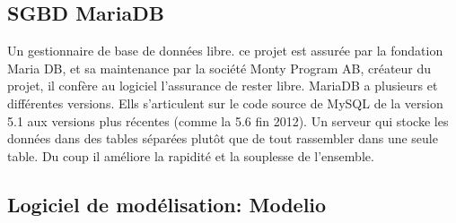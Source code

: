 \subsection{SGBD MariaDB}

Un gestionnaire de base de données libre.
ce projet est assurée par la fondation Maria DB, et sa
maintenance par la société Monty Program AB, créateur du
projet, il confère au logiciel l'assurance de rester libre. MariaDB a
plusieurs et différentes versions. Ells s'articulent sur le code
source de MySQL de la version 5.1 aux versions plus récentes
(comme la 5.6 fin 2012). Un serveur qui stocke les données dans
des tables séparées plutôt que de tout rassembler dans une seule
table. Du coup il améliore la rapidité et la souplesse de
l'ensemble.

\subsection{Logiciel de modélisation: Modelio}

